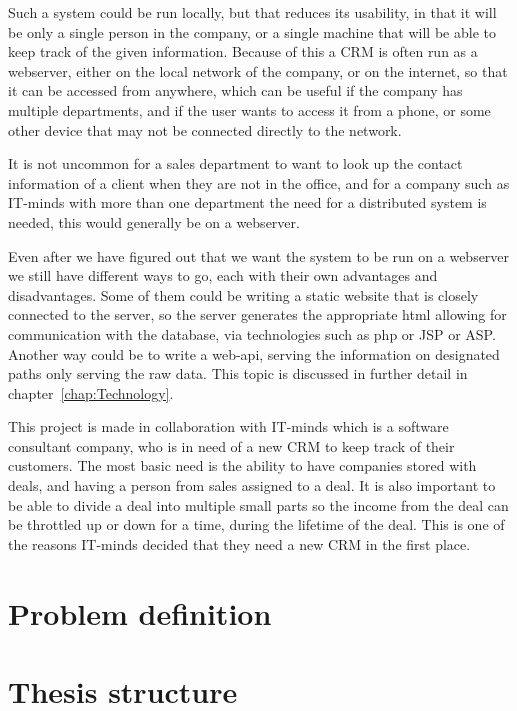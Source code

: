 Such a system could be run locally, but that reduces its usability, in that it will
be only a single person in the company, or a single machine that will be able to keep
track of the given information. Because of this a CRM is often run as a webserver, either
on the local network of the company, or on the internet, so that it can be accessed
from anywhere, which can be useful if the company has multiple departments, and if the
user wants to access it from a phone, or some other device that may not be connected
directly to the network.

It is not uncommon for a sales department to want to look up the contact information
of a client when they are not in the office, and for a company such as IT-minds
with more than one department the need for a distributed system is needed, this would
generally be on a webserver.

Even after we have figured out that we want the system to be run on a webserver we still have
different ways to go, each with their own advantages and disadvantages. Some of them
could be writing a static website that is closely connected to the server, so the server
generates the appropriate html allowing for communication with the database, via technologies
such as php or JSP or ASP.
Another way could be to write a web-api, serving the information on designated paths
only serving the raw data. This topic is discussed in further detail
in chapter~\ref{chap:Technology}.

This project is made in collaboration with IT-minds which is a software consultant company,
who is in need of a new CRM to keep track of their customers. The most basic need is
the ability to have companies stored with deals, and having a person from sales assigned
to a deal. It is also important to be able to divide a deal into multiple small parts
so the income from the deal can be throttled up or down for a time, during the lifetime
of the deal. This is one of the reasons IT-minds decided that they need a new CRM in the
first place.


\section{Problem definition}
\label{sec:Problem definition}

\section{Thesis structure}
\label{sec:Thesis structure}
